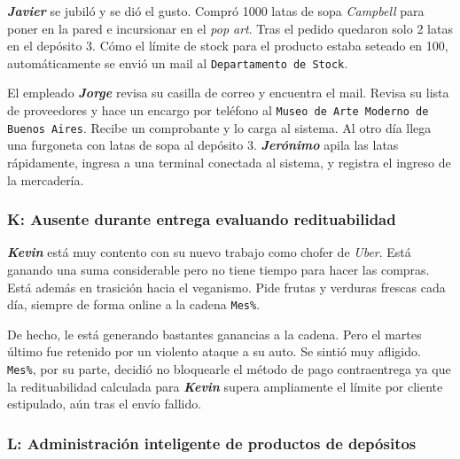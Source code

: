 \textbf{\emph{Javier}} se jubiló y se dió el gusto. Compró 1000 latas de sopa
\textit{Campbell} para poner en la pared e incursionar en el \textit{pop art}.
Tras el pedido quedaron solo 2 latas en el depósito 3. Cómo el límite de stock
para el producto estaba seteado en 100, automáticamente se envió un mail al
\texttt{Departamento de Stock}.

El empleado \textbf{\emph{Jorge}} revisa su casilla de correo y encuentra el
mail. Revisa su lista de proveedores y hace un encargo por teléfono al
\texttt{Museo de Arte Moderno de Buenos Aires}. Recibe un comprobante y lo
carga al sistema. Al otro día llega una furgoneta con latas de sopa al
depósito 3. \textbf{\emph{Jerónimo}} apila las latas rápidamente, ingresa a
una terminal conectada al sistema, y registra el ingreso de la mercadería.

\subsubsection{K: Ausente durante entrega evaluando redituabilidad}

\textbf{\emph{Kevin}} está muy contento con su nuevo trabajo como chofer de
\textit{Uber}. Está ganando una suma considerable pero no tiene tiempo para
hacer las compras. Está además en trasición hacia el veganismo. Pide frutas y
verduras frescas cada día, siempre de forma online a la cadena \texttt{Mes\%}.

De hecho, le está generando bastantes ganancias a la cadena. Pero el martes
último fue retenido por un violento ataque a su auto. Se sintió muy afligido.
\texttt{Mes\%}, por su parte, decidió no bloquearle el método de pago
contraentrega ya que la redituabilidad calculada para \textbf{\emph{Kevin}}
supera ampliamente el límite por cliente estipulado, aún tras el envío
fallido.

\subsubsection{L: Administración inteligente de productos de depósitos}

